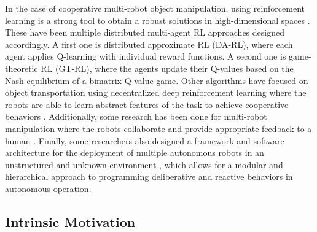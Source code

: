 \documentclass[conference]{IEEEtran}
\begin{document}
In the case of cooperative multi-robot object manipulation, using reinforcement learning is a strong tool to obtain a robust solutions in high-dimensional spaces \cite{ding2020distributed}. These have been multiple distributed multi-agent RL approaches designed accordingly. A first one is distributed approximate RL (DA-RL), where each agent applies Q-learning with individual reward functions. A second one is game-theoretic RL (GT-RL), where the agents update their Q-values based on the Nash equilibrium of a bimatrix Q-value game. Other algorithms have focused on object transportation using decentralized deep reinforcement learning where the robots are able to learn abstract features of the task to achieve cooperative behaviors \cite{zhang2020multirobot}. Additionally, some research has been done for multi-robot manipulation where the robots collaborate and provide appropriate feedback to a human \cite{sieber2015multi}. 
Finally, some researchers also designed a framework and software architecture for the deployment of multiple autonomous robots in an unstructured and unknown environment \cite{fierro2002framework}, which allows for a modular and hierarchical approach to programming deliberative and reactive behaviors in autonomous operation.

\subsection{Intrinsic Motivation}
\end{document}
